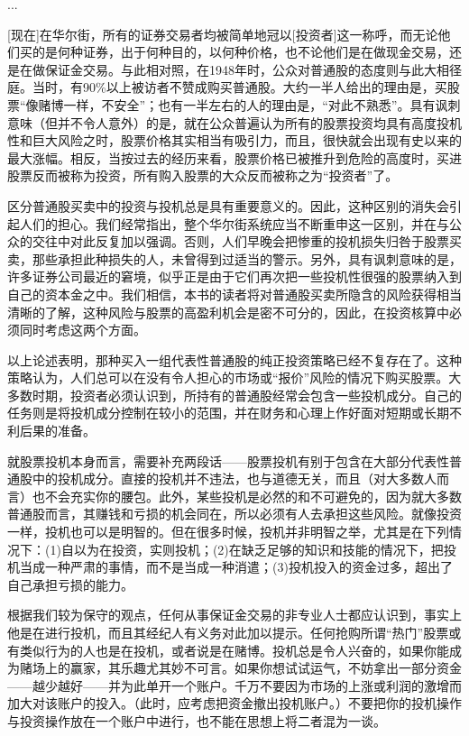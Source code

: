 \documentclass[12pt,oneside]{book}
\begin{document}
...

[现在]在华尔街，所有的证券交易者均被简单地冠以[投资者]这一称呼，而无论他们买的是何种证券，出于何种目的，以何种价格，也不论他们是在做现金交易，还是在做保证金交易。与此相对照，在1948年时，公众对普通股的态度则与此大相径庭。当时，有90\%以上被访者不赞成购买普通股。大约一半人给出的理由是，买股票“像赌博一样，不安全”；也有一半左右的人的理由是，“对此不熟悉”。具有讽刺意味（但并不令人意外）的是，就在公众普遍认为所有的股票投资均具有高度投机性和巨大风险之时，股票价格其实相当有吸引力，而且，很快就会出现有史以来的最大涨幅。相反，当按过去的经历来看，股票价格已被推升到危险的高度时，买进股票反而被称为投资，所有购入股票的大众反而被称之为“投资者”了。

区分普通股买卖中的投资与投机总是具有重要意义的。因此，这种区别的消失会引起人们的担心。我们经常指出，整个华尔街系统应当不断重申这一区别，并在与公众的交往中对此反复加以强调。否则，人们早晚会把惨重的投机损失归咎于股票买卖，那些承担此种损失的人，未曾得到过适当的警示。另外，具有讽刺意味的是，许多证券公司最近的窘境，似乎正是由于它们再次把一些投机性很强的股票纳入到自己的资本金之中。我们相信，本书的读者将对普通股买卖所隐含的风险获得相当清晰的了解，这种风险与股票的高盈利机会是密不可分的，因此，在投资核算中必须同时考虑这两个方面。

以上论述表明，那种买入一组代表性普通股的纯正投资策略已经不复存在了。这种策略认为，人们总可以在没有令人担心的市场或“报价”风险的情况下购买股票。大多数时期，投资者必须认识到，所持有的普通股经常会包含一些投机成分。自己的任务则是将投机成分控制在较小的范围，并在财务和心理上作好面对短期或长期不利后果的准备。

就股票投机本身而言，需要补充两段话——股票投机有别于包含在大部分代表性普通股中的投机成分。直接的投机并不违法，也与道德无关，而且（对大多数人而言）也不会充实你的腰包。此外，某些投机是必然的和不可避免的，因为就大多数普通股而言，其赚钱和亏损的机会同在，所以必须有人去承担这些风险。就像投资一样，投机也可以是明智的。但在很多时候，投机并非明智之举，尤其是在下列情况下：(1)自以为在投资，实则投机；(2)在缺乏足够的知识和技能的情况下，把投机当成一种严肃的事情，而不是当成一种消遣；(3)投机投入的资金过多，超出了自己承担亏损的能力。

根据我们较为保守的观点，任何从事保证金交易的非专业人士都应认识到，事实上他是在进行投机，而且其经纪人有义务对此加以提示。任何抢购所谓“热门”股票或有类似行为的人也是在投机，或者说是在赌博。投机总是令人兴奋的，如果你能成为赌场上的赢家，其乐趣尤其妙不可言。如果你想试试运气，不妨拿出一部分资金——越少越好——并为此单开一个账户。千万不要因为市场的上涨或利润的激增而加大对该账户的投入。（此时，应考虑把资金撤出投机账户。）不要把你的投机操作与投资操作放在一个账户中进行，也不能在思想上将二者混为一谈。
\end{document}
